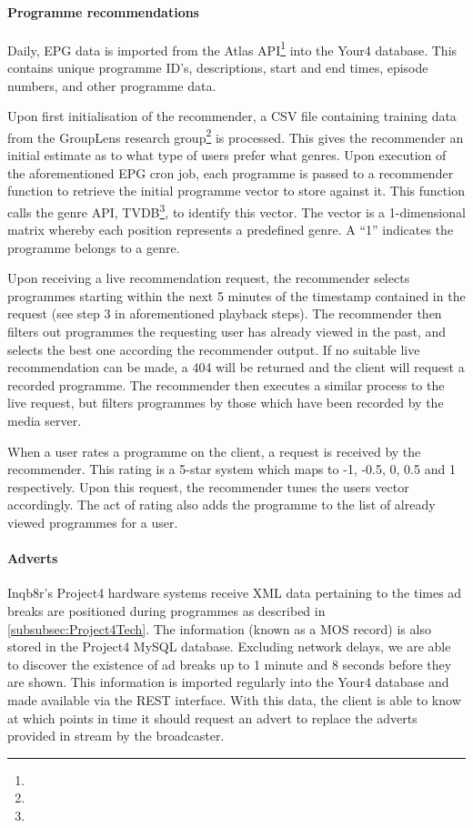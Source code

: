 \paragraph{Programme recommendations}

Daily, EPG data is imported from the Atlas API\footnote{} into the Your4 database. This contains unique programme ID's, descriptions, start and end times, episode numbers, and other programme data.

Upon first initialisation of the recommender, a CSV file containing training data from the GroupLens research group\footnote{} is processed. This gives the recommender an initial estimate as to what type of users prefer what genres. Upon execution of the aforementioned EPG cron job, each programme is passed to a recommender function to retrieve the initial programme vector to store against it. This function calls the genre API, TVDB\footnote{}, to identify this vector. The vector is a 1-dimensional matrix whereby each position represents a predefined genre. A ``1'' indicates the programme belongs to a genre.

Upon receiving a live recommendation request, the recommender selects programmes starting within the next 5 minutes of the timestamp contained in the request (see step 3 in aforementioned playback steps). The recommender then filters out programmes the requesting user has already viewed in the past, and selects the best one according the recommender output. If no suitable live recommendation can be made, a 404 will be returned and the client will request a recorded programme. The recommender then executes a similar process to the live request, but filters programmes by those which have been recorded by the media server.

When a user rates a programme on the client, a request is received by the recommender. This rating is a 5-star system which maps to -1, -0.5, 0, 0.5 and 1 respectively. Upon this request, the recommender tunes the users vector accordingly. The act of rating also adds the programme to the list of already viewed programmes for a user.

\paragraph{Adverts}

Inqb8r's Project4 hardware systems receive XML data pertaining to the times ad breaks are positioned during programmes as described in \ref{subsubsec:Project4Tech}. The information (known as a MOS record) is also stored in the Project4 MySQL database. Excluding network delays, we are able to discover the existence of ad breaks up to 1 minute and 8 seconds before they are shown. This information is imported regularly into the Your4 database and made available via the REST interface. With this data, the client is able to know at which points in time it should request an advert to replace the adverts provided in stream by the broadcaster.

